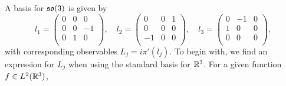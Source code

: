 \documentclass[a4paper]{article}
\begin{document}



A basis for $\mathfrak{so}(3)$ is given by 
$$l_1 = \begin{pmatrix} 0 & 0 & 0 \\ 0 & 0 & -1 \\ 0 & 1 & 0 \\ \end{pmatrix}, \hspace{1em} l_2 = \begin{pmatrix} 0 & 0 & 1 \\ 0 & 0 & 0 \\ -1 & 0 & 0 \\ \end{pmatrix}, \hspace{1em} l_3 = \begin{pmatrix} 0 & -1 & 0 \\ 1 & 0 & 0 \\ 0 & 0 & 0 \\ \end{pmatrix},$$
with corresponding observables $L_j = i\pi'(l_j)$. To begin with, we find an expression for $L_j$ when using the standard basis for $\mathbb{R}^3$. For a given function $f \in L^2(\mathbb{R}^3)$,
\end{document}
